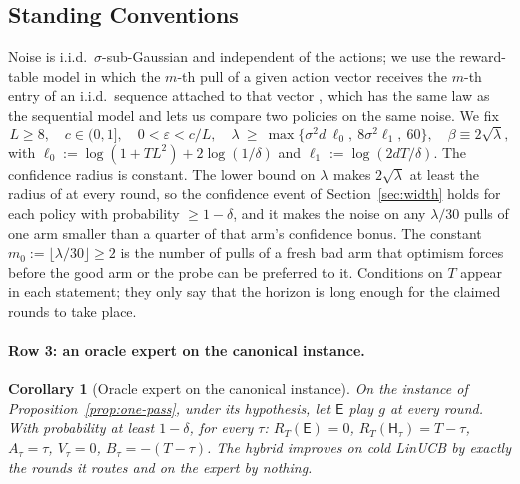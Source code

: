 \documentclass{article}
\newtheorem{corollary}{Corollary}
\theoremstyle{definition}
\theoremstyle{remark}
\newcommand{\eps}{\varepsilon}
\theoremstyle{remark}
\newcommand{\Exp}{\mathsf{E}}
\newcommand{\Hyb}{\mathsf{H}}
\begin{document}
\subsection{Standing Conventions}
\label{sec:template}

Noise is i.i.d.\ $\sigma$-sub-Gaussian and independent of the actions; we use
the reward-table model in which the $m$-th pull of a given action vector
receives the $m$-th entry of an i.i.d.\ sequence attached to that vector
\cite[\S4.6]{lattimore2020bandit}, which has the same law as the sequential
model and lets us compare two policies on the same noise. We fix
\begin{equation}
\label{eq:conventions}
L\ge8,\quad c\in(0,1],\quad 0<\eps<c/L,\quad
\lambda\ \ge\ \max\bigl\{\sigma^2d\,\ell_0,\ 8\sigma^2\ell_1,\ 60\bigr\},\quad
\beta\equiv2\sqrt\lambda,
\end{equation}
with $\ell_0:=\log(1+TL^2)+2\log(1/\delta)$ and $\ell_1:=\log(2dT/\delta)$.
The confidence radius is constant. The lower bound on $\lambda$ makes
$2\sqrt\lambda$ at least the radius of \cite{abbasi2011improved} at every
round, so the confidence event of Section~\ref{sec:width} holds for each
policy with probability $\ge1-\delta$, and it makes the noise on any $\lambda/30$
pulls of one arm smaller than a quarter of that arm's confidence bonus. The
constant $m_0:=\lfloor\lambda/30\rfloor\ge2$ is the number of pulls of a
fresh bad arm that optimism forces before the good arm or the probe can be
preferred to it. Conditions on $T$ appear in each statement; they only say
that the horizon is long enough for the claimed rounds to take place.


\paragraph{Row 3: an oracle expert on the canonical instance.}
\begin{corollary}[Oracle expert on the canonical instance]
\label{cor:cat-oracle}
On the instance of Proposition~\ref{prop:one-pass}, under its hypothesis, let
$\Exp$ play $g$ at every round. With probability at least $1-\delta$, for every
$\tau$: $R_T(\Exp)=0$, $R_T(\Hyb_\tau)=T-\tau$, $A_\tau=\tau$, $V_\tau=0$,
$B_\tau=-(T-\tau)$. The hybrid improves on cold LinUCB by exactly the rounds
it routes and on the expert by nothing.
\end{corollary}
\end{document}
